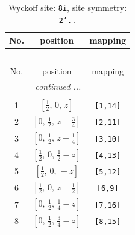 \documentclass[fleqn,8pt]{jsarticle}
\begin{document}
\begin{longtable}{ccc}
\caption{Wyckoff site: {\tt 8i}, site symmetry: {\tt 2'..}}
 \\
 \hline \hline
No. & position & mapping \\ \hline \endfirsthead

\multicolumn{2}{l}{\tablename\ \thetable{}} \\
 \hline \hline
No. & position & mapping \\ \hline \endhead

 \hline \hline
\multicolumn{2}{r}{\footnotesize\it continued ...} \\ \endfoot

 \hline \hline
\multicolumn{2}{r}{} \\ \endlastfoot

1 & $\left[ \frac{1}{2},\, 0,\, z \right]$ & {\tt [1,14]} \\ \hline
2 & $\left[ 0,\, \frac{1}{2},\, z + \frac{3}{4} \right]$ & {\tt [2,11]} \\ \hline
3 & $\left[ 0,\, \frac{1}{2},\, z + \frac{1}{4} \right]$ & {\tt [3,10]} \\ \hline
4 & $\left[ \frac{1}{2},\, 0,\, \frac{1}{2} - z \right]$ & {\tt [4,13]} \\ \hline
5 & $\left[ \frac{1}{2},\, 0,\, - z \right]$ & {\tt [5,12]} \\ \hline
6 & $\left[ \frac{1}{2},\, 0,\, z + \frac{1}{2} \right]$ & {\tt [6,9]} \\ \hline
7 & $\left[ 0,\, \frac{1}{2},\, \frac{1}{4} - z \right]$ & {\tt [7,16]} \\ \hline
8 & $\left[ 0,\, \frac{1}{2},\, \frac{3}{4} - z \right]$ & {\tt [8,15]} \\
\end{longtable}
\renewcommand{\arraystretch}{1.2}
\end{document}
